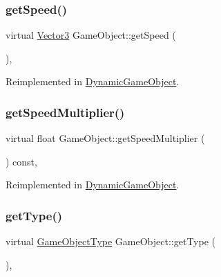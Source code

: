 \mbox{\label{class_game_object_ac08043ba5563ecbd118e522169f7f919}} 
\subsubsection{\texorpdfstring{get\+Speed()}{getSpeed()}}
{\footnotesize\ttfamily virtual \hyperlink{class_vector3}{Vector3} Game\+Object\+::get\+Speed (\begin{DoxyParamCaption}{ }\end{DoxyParamCaption})\hspace{0.3cm}{\ttfamily [inline]}, {\ttfamily [virtual]}}



Reimplemented in \hyperlink{class_dynamic_game_object_a22d2cededc50901db950ac23b46e4d42}{Dynamic\+Game\+Object}.

\mbox{\label{class_game_object_a577ca32504b1551f75e1724219c4f6cf}} 
\subsubsection{\texorpdfstring{get\+Speed\+Multiplier()}{getSpeedMultiplier()}}
{\footnotesize\ttfamily virtual float Game\+Object\+::get\+Speed\+Multiplier (\begin{DoxyParamCaption}{ }\end{DoxyParamCaption}) const\hspace{0.3cm}{\ttfamily [inline]}, {\ttfamily [virtual]}}



Reimplemented in \hyperlink{class_dynamic_game_object_a677f4bdcd11800fee831a13234382619}{Dynamic\+Game\+Object}.

\mbox{\label{class_game_object_ab7ee421293a4bbe47b4102180185fbaa}} 
\subsubsection{\texorpdfstring{get\+Type()}{getType()}}
{\footnotesize\ttfamily virtual \hyperlink{_game_object_8h_a57678b60d65afb213d04a6b090c64a08}{Game\+Object\+Type} Game\+Object\+::get\+Type (\begin{DoxyParamCaption}{ }\end{DoxyParamCaption})\hspace{0.3cm}{\ttfamily [inline]}, {\ttfamily [virtual]}}



